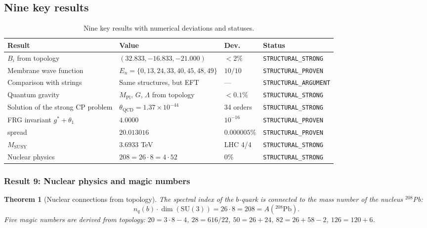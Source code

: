 \documentclass[11pt,a4paper]{article}
\newcommand{\SU}{\ensuremath{\mathrm{SU}}}
\newtheorem{theorem}{Theorem}[section]
\theoremstyle{definition}
\begin{document}
\subsection{Nine key results}
\label{subsec:conclusions-nine-results}
\begin{table}[htbp]
\centering
\small
\setlength{\tabcolsep}{4pt}
\caption{Nine key results with numerical deviations and statuses.}
\label{tab:nine-results-summary}
\begin{tabular}{@{}p{4.5cm}p{5.2cm}p{1.6cm}p{3.2cm}@{}}
\toprule
Result & Value & Dev. & Status \\
\midrule
$B_i$ from topology 
    & $(32.833, -16.833, -21.000)$ 
    & $< 2\%$ 
    & \texttt{STRUCTURAL\_STRONG} \\[0.3em]
Membrane wave function 
    & $E_n = \{0,13,24,33,40,45,48,49\}$ 
    & $10/10$ 
    & \texttt{STRUCTURAL\_PROVEN} \\[0.3em]
Comparison with strings
    & Same structures, but EFT
    & ---
    & \texttt{STRUCTURAL\_ARGUMENT} \\[0.3em]
Quantum gravity
    & $M_{\text{Pl}}$, $G$, $\Lambda$ from topology
    & $< 0.1\%$
    & \texttt{STRUCTURAL\_STRONG} \\[0.3em]
Solution of the strong CP problem
    & $\theta_{\text{QCD}} = 1.37 \times 10^{-44}$
    & 34 orders
    & \texttt{STRUCTURAL\_STRONG} \\[0.3em]
FRG invariant $g^*+\theta_1$ 
    & $4.0000$ 
    & $10^{-16}$ 
    & \texttt{STRUCTURAL\_PROVEN} \\[0.3em]
spread 
    & $20.013016$ 
    & $0.000005\%$ 
    & \texttt{STRUCTURAL\_PROVEN} \\[0.3em]
$M_{\text{SUSY}}$ 
    & $3.6933$ TeV 
    & LHC 4/4 
    & \texttt{STRUCTURAL\_STRONG} \\[0.3em]
Nuclear physics
    & $208 = 26 \cdot 8 = 4 \cdot 52$
    & $0\%$
    & \texttt{STRUCTURAL\_STRONG} \\
\bottomrule
\end{tabular}
\end{table}

\subsubsection{Result 9: Nuclear physics and magic numbers}

\begin{theorem}[Nuclear connections from topology]
\label{thm:conclusion-nuclear}
The spectral index of the $b$-quark is connected to the mass number
of the nucleus $^{208}$Pb:
\begin{equation}
    n_q(b) \cdot \dim(\SU(3)) = 26 \cdot 8 = 208 = A(^{208}\text{Pb}).
\end{equation}
Five magic numbers are derived from topology:
$20 = 3 \cdot 8 - 4$, $28 = 616/22$, $50 = 26 + 24$,
$82 = 26 + 58 - 2$, $126 = 120 + 6$.
\end{theorem}
\end{document}
